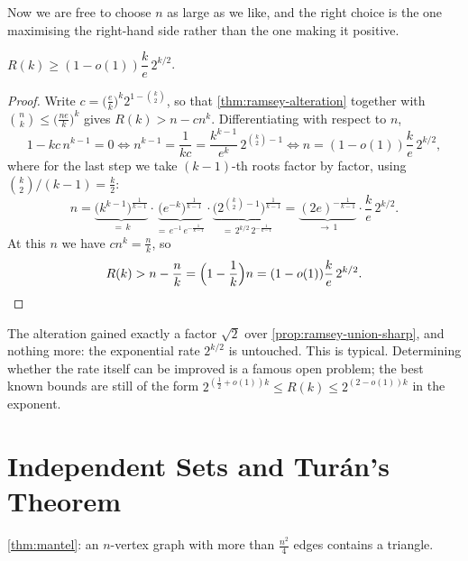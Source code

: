 Now we are free to choose \(n\) as large as we like, and the right choice is the one maximising the right-hand side rather than the one making it positive.

\begin{corollary}\label{cor:ramsey-alteration}
    \(R(k) \ge (1 - o(1)) \dfrac{k}{e} \, 2^{k/2}\).
\end{corollary}

\begin{proof}
    Write \(c = \bigl( \frac{e}{k} \bigr)^{k} 2^{1 - \binom{k}{2}}\), so that \autoref{thm:ramsey-alteration} together with \(\binom{n}{k} \le \bigl( \frac{ne}{k} \bigr)^k\) gives \(R(k) > n - c n^k\). Differentiating with respect to \(n\),
    \[
        1 - k c \, n^{k-1} = 0
        \iff n^{k-1} = \frac{1}{kc} = \frac{k^{k-1}}{e^{k}} \, 2^{\binom{k}{2} - 1}
        \iff n = (1-o(1)) \frac{k}{e} \, 2^{k/2},
    \]
    where for the last step we take \((k-1)\)-th roots factor by factor, using \(\binom{k}{2}/(k-1) = \frac{k}{2}\):
    \[
        n
        = \underbrace{\bigl(k^{k-1}\bigr)^{\frac{1}{k-1}}}_{=\,k}
        \cdot \underbrace{\bigl(e^{-k}\bigr)^{\frac{1}{k-1}}}_{=\,e^{-1} \, e^{-\frac{1}{k-1}}}
        \cdot \underbrace{\bigl(2^{\binom{k}{2} - 1}\bigr)^{\frac{1}{k-1}}}_{=\,2^{k/2} \, 2^{-\frac{1}{k-1}}}
        = \underbrace{(2e)^{-\frac{1}{k-1}}}_{\to\, 1} \cdot \frac{k}{e} \, 2^{k/2}.
    \]
    At this \(n\) we have \(c n^{k} = \frac{n}{k}\), so
    \[
        R(k) > n - \frac{n}{k} = \Bigl( 1 - \frac{1}{k} \Bigr) n = (1-o(1)) \frac{k}{e} \, 2^{k/2}. \qedhere
    \]
\end{proof}

\begin{remark}
    The alteration gained exactly a factor \(\sqrt{2}\) over \autoref{prop:ramsey-union-sharp}, and nothing more: the exponential rate \(2^{k/2}\) is untouched. This is typical. Determining whether the rate itself can be improved is a famous open problem; the best known bounds are still of the form \(2^{(\frac{1}{2} + o(1))k} \le R(k) \le 2^{(2 - o(1))k}\) in the exponent.
\end{remark}

\section{Independent Sets and Tur\'an's Theorem}\label{sec:turan}

\begin{recall}
    \autoref{thm:mantel}: an \(n\)-vertex graph with more than \(\frac{n^2}{4}\) edges contains a triangle.
\end{recall}

